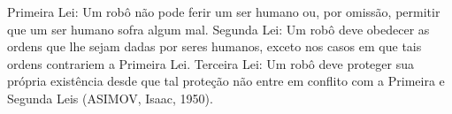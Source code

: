 
\begin{epigrafe}%
Primeira Lei: Um robô não pode ferir um ser humano ou, por omissão, permitir que um ser humano sofra algum mal. Segunda Lei: Um robô deve obedecer as ordens que lhe sejam dadas por seres humanos, exceto nos casos em que tais ordens contrariem a Primeira Lei. Terceira Lei: Um robô deve proteger sua própria existência desde que tal proteção não entre em conflito com a Primeira e Segunda Leis (ASIMOV, Isaac, 1950).
\end{epigrafe}
